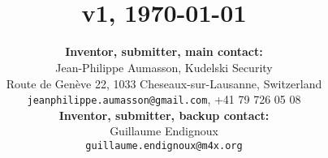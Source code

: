 
\title{
\Huge{\gravity} \\[0.15cm]
\large{v1}, \today
}

\author{
\textbf{Inventor, submitter, main contact:}  \\[0.15cm]
Jean-Philippe Aumasson, Kudelski Security \\[0.15cm]
Route de Genève 22, 1033 Cheseaux-sur-Lausanne, Switzerland \\[0.15cm]
\texttt{jeanphilippe.aumasson@gmail.com}, +41 79 726 05 08 \\[0.5cm]
\textbf{Inventor, submitter, backup contact:}  \\[0.15cm]
Guillaume Endignoux \\[0.15cm]
\texttt{guillaume.endignoux@m4x.org} \\[0.5cm]
}

\date{}

\maketitle

